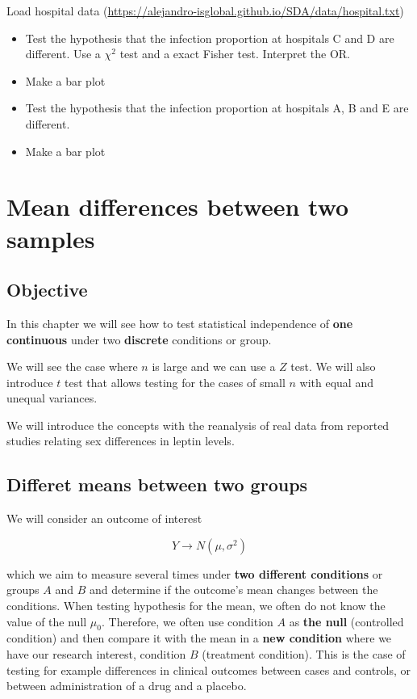 \documentclass[
]{book}
\begin{document}
Load hospital data (\url{https://alejandro-isglobal.github.io/SDA/data/hospital.txt})

\begin{itemize}
\item
  Test the hypothesis that the infection proportion at hospitals C and D are different. Use a \(\chi^2\) test and a exact Fisher test. Interpret the OR.
\item
  Make a bar plot
\item
  Test the hypothesis that the infection proportion at hospitals A, B and E are different.
\item
  Make a bar plot
\end{itemize}

\hypertarget{mean-differences-between-two-samples}{%
\chapter{Mean differences between two samples}\label{mean-differences-between-two-samples}}

\hypertarget{objective-11}{%
\section{Objective}\label{objective-11}}

In this chapter we will see how to test statistical independence of \textbf{one continuous} under two \textbf{discrete} conditions or group.

We will see the case where \(n\) is large and we can use a \(Z\) test. We will also introduce \(t\) test that allows testing for the cases of small \(n\) with equal and unequal variances.

We will introduce the concepts with the reanalysis of real data from reported studies relating sex differences in leptin levels.

\hypertarget{differet-means-between-two-groups}{%
\section{Differet means between two groups}\label{differet-means-between-two-groups}}

We will consider an outcome of interest

\[ Y \rightarrow N(\mu, \sigma^2)\]

which we aim to measure several times under \textbf{two different conditions} or groups \(A\) and \(B\) and determine if the outcome's mean changes between the conditions. When testing hypothesis for the mean, we often do not know the value of the null \(\mu_0\). Therefore, we often use condition \(A\) as \textbf{the null} (controlled condition) and then compare it with the mean in a \textbf{new condition} where we have our research interest, condition \(B\) (treatment condition). This is the case of testing for example differences in clinical outcomes between cases and controls, or between administration of a drug and a placebo.
\end{document}
